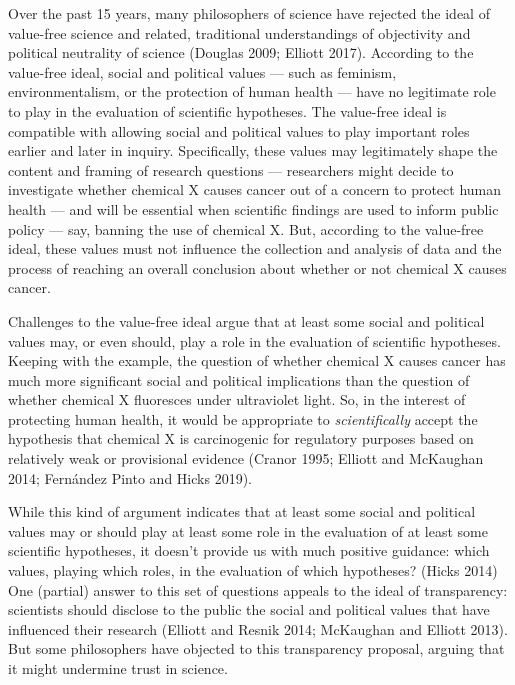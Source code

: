 \documentclass[
  letterpaper,
  DIV=11,
  numbers=noendperiod]{scrartcl}
\begin{document}
Over the past 15 years, many philosophers of science have rejected the
ideal of value-free science and related, traditional understandings of
objectivity and political neutrality of science (Douglas 2009; Elliott
2017). According to the value-free ideal, social and political values
--- such as feminism, environmentalism, or the protection of human
health --- have no legitimate role to play in the evaluation of
scientific hypotheses. The value-free ideal is compatible with allowing
social and political values to play important roles earlier and later in
inquiry. Specifically, these values may legitimately shape the content
and framing of research questions --- researchers might decide to
investigate whether chemical X causes cancer out of a concern to protect
human health --- and will be essential when scientific findings are used
to inform public policy --- say, banning the use of chemical X. But,
according to the value-free ideal, these values must not influence the
collection and analysis of data and the process of reaching an overall
conclusion about whether or not chemical X causes cancer.

Challenges to the value-free ideal argue that at least some social and
political values may, or even should, play a role in the evaluation of
scientific hypotheses. Keeping with the example, the question of whether
chemical X causes cancer has much more significant social and political
implications than the question of whether chemical X fluoresces under
ultraviolet light. So, in the interest of protecting human health, it
would be appropriate to \emph{scientifically} accept the hypothesis that
chemical X is carcinogenic for regulatory purposes based on relatively
weak or provisional evidence (Cranor 1995; Elliott and McKaughan 2014;
Fernández Pinto and Hicks 2019).

While this kind of argument indicates that at least some social and
political values may or should play at least some role in the evaluation
of at least some scientific hypotheses, it doesn't provide us with much
positive guidance: which values, playing which roles, in the evaluation
of which hypotheses? (Hicks 2014) One (partial) answer to this set of
questions appeals to the ideal of transparency: scientists should
disclose to the public the social and political values that have
influenced their research (Elliott and Resnik 2014; McKaughan and
Elliott 2013). But some philosophers have objected to this transparency
proposal, arguing that it might undermine trust in science.
\end{document}
